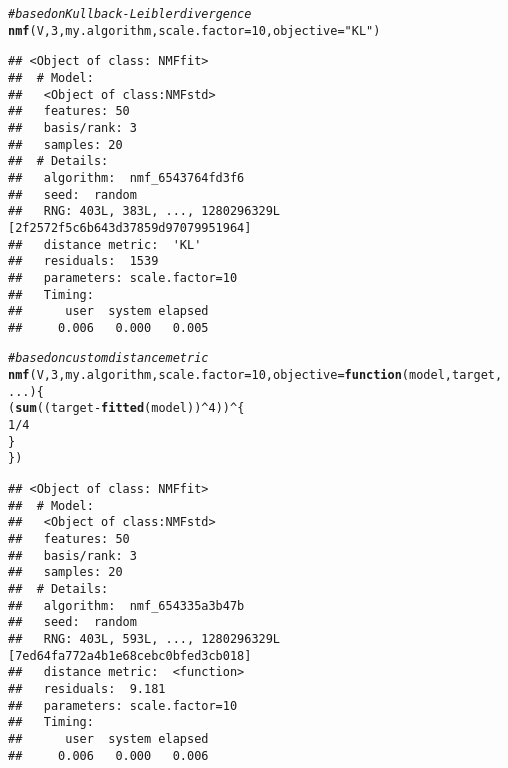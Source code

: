 \documentclass[a4paper]{article}\usepackage[]{graphicx}\usepackage[]{color}
\makeatletter
\newcommand{\hlnum}[1]{\textcolor[rgb]{0.686,0.059,0.569}{#1}}%
\newcommand{\hlstr}[1]{\textcolor[rgb]{0.192,0.494,0.8}{#1}}%
\newcommand{\hlcom}[1]{\textcolor[rgb]{0.678,0.584,0.686}{\textit{#1}}}%
\newcommand{\hlopt}[1]{\textcolor[rgb]{0,0,0}{#1}}%
\newcommand{\hlstd}[1]{\textcolor[rgb]{0.345,0.345,0.345}{#1}}%
\newcommand{\hlkwa}[1]{\textcolor[rgb]{0.161,0.373,0.58}{\textbf{#1}}}%
\newcommand{\hlkwc}[1]{\textcolor[rgb]{0.333,0.667,0.333}{#1}}%
\newcommand{\hlkwd}[1]{\textcolor[rgb]{0.737,0.353,0.396}{\textbf{#1}}}%
\newenvironment{kframe}{%
 \def\at@end@of@kframe{}%
 \ifinner\ifhmode%
  \def\at@end@of@kframe{\end{minipage}}%
  \begin{minipage}{\columnwidth}%
 \fi\fi%
 \def\FrameCommand##1{\hskip\@totalleftmargin \hskip-\fboxsep
 \colorbox{shadecolor}{##1}\hskip-\fboxsep
     \hskip-\linewidth \hskip-\@totalleftmargin \hskip\columnwidth}%
 \MakeFramed {\advance\hsize-\width
   \@totalleftmargin\z@ \linewidth\hsize
   \@setminipage}}%
 {\par\unskip\endMakeFramed%
 \at@end@of@kframe}
\newenvironment{knitrout}{}{} %
\makeatother
\begin{document}
\begin{knitrout}
\color{fgcolor}\begin{kframe}
\begin{alltt}
\hlcom{# based on Kullback-Leibler divergence}
\hlkwd{nmf}\hlstd{(V,} \hlnum{3}\hlstd{, my.algorithm,} \hlkwc{scale.factor} \hlstd{=} \hlnum{10}\hlstd{,} \hlkwc{objective} \hlstd{=} \hlstr{"KL"}\hlstd{)}
\end{alltt}
\begin{verbatim}
## <Object of class: NMFfit>
##  # Model:
##   <Object of class:NMFstd>
##   features: 50 
##   basis/rank: 3 
##   samples: 20 
##  # Details:
##   algorithm:  nmf_6543764fd3f6 
##   seed:  random 
##   RNG: 403L, 383L, ..., 1280296329L [2f2572f5c6b643d37859d97079951964]
##   distance metric:  'KL' 
##   residuals:  1539 
##   parameters: scale.factor=10 
##   Timing:
##      user  system elapsed 
##     0.006   0.000   0.005
\end{verbatim}
\begin{alltt}
\hlcom{# based on custom distance metric}
\hlkwd{nmf}\hlstd{(V,} \hlnum{3}\hlstd{, my.algorithm,} \hlkwc{scale.factor} \hlstd{=} \hlnum{10}\hlstd{,} \hlkwc{objective} \hlstd{=} \hlkwa{function}\hlstd{(}\hlkwc{model}\hlstd{,} \hlkwc{target}\hlstd{,}
    \hlkwc{...}\hlstd{) \{}
    \hlstd{(}\hlkwd{sum}\hlstd{((target} \hlopt{-} \hlkwd{fitted}\hlstd{(model))}\hlopt{^}\hlnum{4}\hlstd{))}\hlopt{^}\hlstd{\{}
        \hlnum{1}\hlopt{/}\hlnum{4}
    \hlstd{\}}
\hlstd{\})}
\end{alltt}
\begin{verbatim}
## <Object of class: NMFfit>
##  # Model:
##   <Object of class:NMFstd>
##   features: 50 
##   basis/rank: 3 
##   samples: 20 
##  # Details:
##   algorithm:  nmf_654335a3b47b 
##   seed:  random 
##   RNG: 403L, 593L, ..., 1280296329L [7ed64fa772a4b1e68cebc0bfed3cb018]
##   distance metric:  <function> 
##   residuals:  9.181 
##   parameters: scale.factor=10 
##   Timing:
##      user  system elapsed 
##     0.006   0.000   0.006
\end{verbatim}
\end{kframe}
\end{knitrout}


%
%
\end{document}
